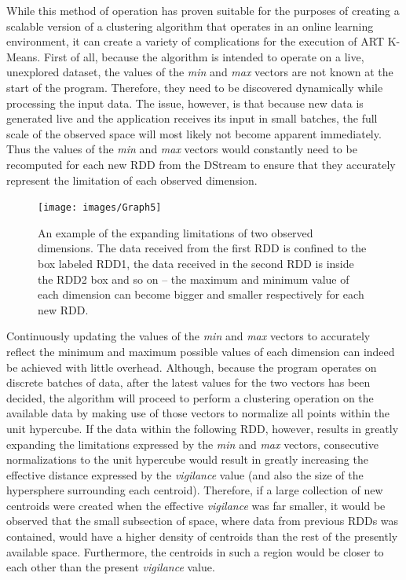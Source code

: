 \documentclass{l4proj}
\begin{document}
While this method of operation has proven suitable for the purposes of creating a scalable version of a clustering algorithm that operates in an online learning environment, it can create a variety of complications for the execution of ART K-Means. First of all, because the algorithm is intended to operate on a live, unexplored dataset, the values of the \textit{min} and \textit{max} vectors are not known at the start of the program. Therefore, they need to be discovered dynamically while processing the input data. The issue, however, is that because new data is generated live and the application receives its input in small batches, the full scale of the observed space will most likely not become apparent immediately. Thus the values of the \textit{min} and \textit{max} vectors would constantly need to be recomputed for each new RDD from the DStream to ensure that they accurately represent the limitation of each observed dimension.\\

\begin{figure}[H]
	\centering
    \label{minMaxgraph}
    \texttt{[image: images/Graph5]}
    \caption{An example of the expanding limitations of two observed dimensions. The data received from the first RDD is confined to the box labeled RDD1, the data received in the second RDD is inside the RDD2 box and so on -- the maximum and minimum value of each dimension can become bigger and smaller respectively for each new RDD.} 
\end{figure}

Continuously updating the values of the \textit{min} and \textit{max} vectors to accurately reflect the minimum and maximum possible values of each dimension can indeed be achieved with little overhead. Although, because the program operates on discrete batches of data, after the latest values for the two vectors has been decided, the algorithm will proceed to perform a clustering operation on the available data by making use of those vectors to normalize all points within the unit hypercube. If the data within the following RDD, however, results in greatly expanding the limitations expressed by the \textit{min} and \textit{max} vectors, consecutive normalizations to the unit hypercube would result in greatly increasing the effective distance expressed by the \textit{vigilance} value (and also the size of the hypersphere surrounding each centroid). Therefore, if a large collection of new centroids were created when the effective \textit{vigilance} was far smaller, it would be observed that the small subsection of space, where data from previous RDDs was contained, would have a higher density of centroids than the rest of the presently available space. Furthermore, the centroids in such a region would be closer to each other than the present \textit{vigilance} value.
\end{document}
